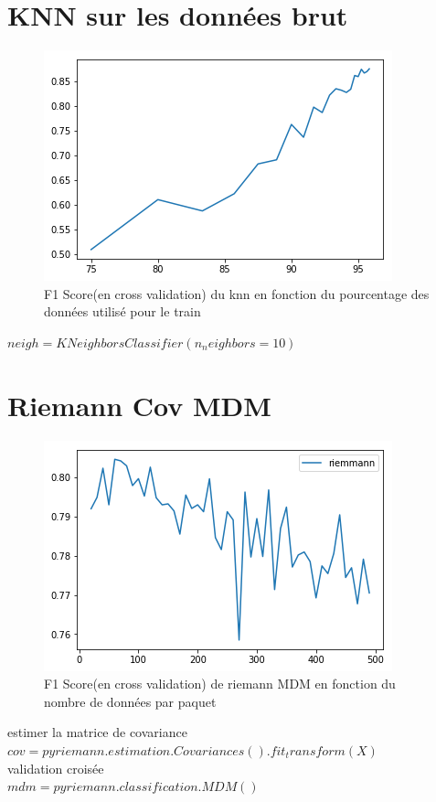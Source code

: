 \documentclass{article}
\begin{document}
\section{KNN sur les données brut}
\begin{figure}[H]
\begin{center}
\includegraphics[scale=1]{images/knn_brut_f1Score.png}
\end{center}
\caption{F1 Score(en cross validation) du knn en fonction du pourcentage des données utilisé pour le train}
\end{figure}
$
neigh = KNeighborsClassifier(n_neighbors=10)
$
\section{Riemann Cov MDM }
\begin{figure}[H]
\begin{center}
\includegraphics[scale=1]{images/riemann_cov_MDM_f1Score.png}
\end{center}
\caption{F1 Score(en cross validation) de riemann MDM en fonction du nombre de données par paquet}
\end{figure}

estimer la matrice de covariance\\
$
cov = pyriemann.estimation.Covariances().fit_transform(X)
$
\\
validation croisée\\
$
mdm = pyriemann.classification.MDM()
$
\end{document}
